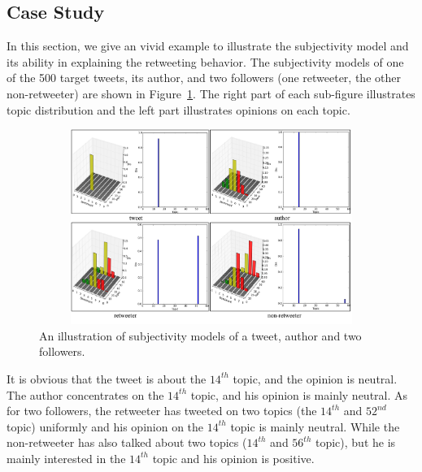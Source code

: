\documentclass[letterpaper]{article}
\begin{document}
\subsection{Case Study}
\label{example}
In this section, we give an vivid example to illustrate the subjectivity model and its ability in explaining the retweeting behavior. 
The subjectivity models of one of the 500 target tweets, its author, and two followers (one retweeter, the other non-retweeter) are shown in Figure~\ref{fig5}. 
The right part of each sub-figure illustrates topic distribution and the left part illustrates opinions on each topic. 
\begin{figure}[htb]
\centering
\includegraphics[width=4.5in,height=2.5in]{fig5.pdf}
\caption{An illustration of subjectivity models of a tweet, author and two followers.}
\label{fig5}
\end{figure}

It is obvious that the tweet is about the $ 14^{th} $ topic, and the opinion is neutral.
The author concentrates on the $ 14^{th} $ topic, and his opinion is mainly neutral.
As for two followers, the retweeter has tweeted on two topics (the $ 14^{th} $ and $ 52^{nd} $ topic) uniformly 
and his opinion on the $ 14^{th} $ topic is mainly neutral.
While the non-retweeter has also talked about two topics ($ 14^{th} $ and $ 56^{th} $ topic), but he is mainly interested in the $ 14^{th} $ topic 
and his opinion is positive.
\end{document}
